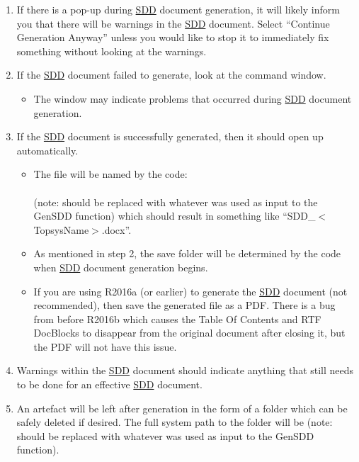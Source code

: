 \documentclass{mcscert}
\begin{document}
\begin{enumerate}
\begin{itemize}
	\end{itemize}
  \item If there is a pop-up during \hyperref[acr:sdd]{SDD} document generation, it will likely inform you that there will be warnings in the \hyperref[acr:sdd]{SDD} document. 
  Select ``Continue Generation Anyway'' unless you would like to stop it to immediately fix something without looking at the warnings.
  \item If the \hyperref[acr:sdd]{SDD} document failed to generate, look at the \matlab{} command window.
  \begin{itemize}
    \item The window may indicate problems that occurred during \hyperref[acr:sdd]{SDD} document generation.
  \end{itemize}
  \item If the \hyperref[acr:sdd]{SDD} document is successfully generated, then it should open up automatically.
  \begin{itemize}
    \item The file will be named by the \matlab{} code: \\
     \\
    (note:  should be replaced with whatever was used as input to the GenSDD function) which should result in something like ``SDD\_$<$TopsysName$>$.docx''.
    \item As mentioned in step 2, the save folder will be determined by the \matlab{} code  when \hyperref[acr:sdd]{SDD} document generation begins.
    \item If you are using \matlab{} R2016a (or earlier) to generate the \hyperref[acr:sdd]{SDD} document (not recommended), then save the generated file as a PDF. 
    There is a bug from before \matlab{} R2016b which causes the Table Of Contents and RTF \textsf{DocBlocks} to disappear from the original document after closing it, but the PDF will not have this issue.
	\end{itemize}
  \item Warnings within the \hyperref[acr:sdd]{SDD} document should indicate anything that still needs to be done for an effective \hyperref[acr:sdd]{SDD} document.
  \item An artefact will be left after generation in the form of a folder which can be safely deleted if desired.
  The full system path to the folder will be  (note:  should be replaced with whatever was used as input to the GenSDD function).
\end{enumerate}
\end{document}
